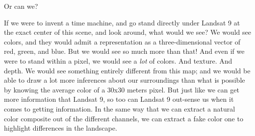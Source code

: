 \documentclass[
  letterpaper,
]{scrbook}
\begin{document}
Or can we?

If we were to invent a time machine, and go stand directly under Landsat
9 at the exact center of this scene, and look around, what would we see?
We would see colors, and they would admit a representation as a
three-dimensional vector of red, green, and blue. But we would see so
much more than that! And even if we were to stand within a pixel, we
would see a \emph{lot} of colors. And texture. And depth. We would see
something entirely different from this map; and we would be able to draw
a lot more inferences about our surroundings than what is possible by
knowing the average color of a 30x30 meters pixel. But just like we can
get more information that Landsat 9, so too can Landsat 9 out-sense us
when it comes to getting information. In the same way that we can
extract a natural color composite out of the different channels, we can
extract a fake color one to highlight differences in the landscape.

\begin{figure}[bt]



\end{figure}%
\end{document}
